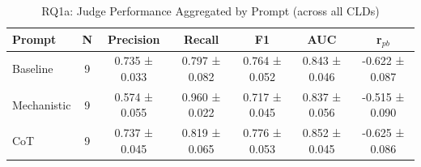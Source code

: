 \begin{table}[htbp]
\centreing
\caption{RQ1a: Judge Performance Aggregated by Prompt (across all CLDs)}
\label{tab:rq1a_by_prompt}
\begin{tabular}{lcccccc}
\toprule
\textbf{Prompt} & \textbf{N} & \textbf{Precision} & \textbf{Recall} & \textbf{F1} & \textbf{AUC} & \textbf{r$_{pb}$} \\
\midrule
Baseline & 9 & 0.735 ± 0.033 & 0.797 ± 0.082 & 0.764 ± 0.052 & 0.843 ± 0.046 & -0.622 ± 0.087 \\
Mechanistic & 9 & 0.574 ± 0.055 & 0.960 ± 0.022 & 0.717 ± 0.045 & 0.837 ± 0.056 & -0.515 ± 0.090 \\
CoT & 9 & 0.737 ± 0.045 & 0.819 ± 0.065 & 0.776 ± 0.053 & 0.852 ± 0.045 & -0.625 ± 0.086 \\
\bottomrule
\end{tabular}
\end{table}